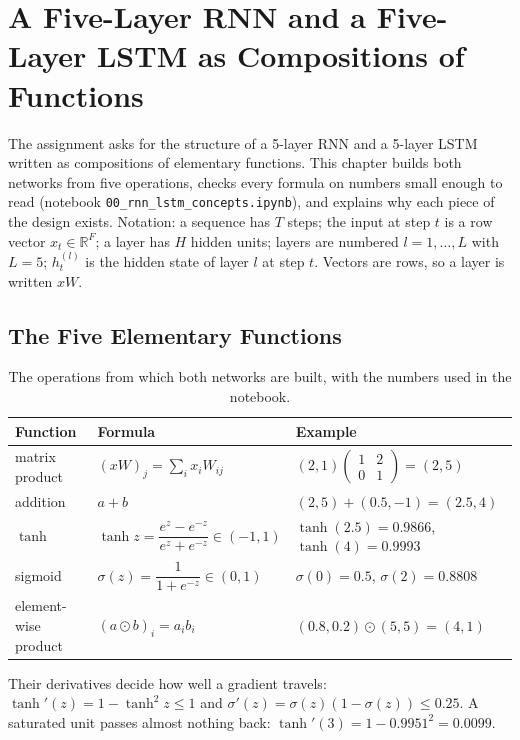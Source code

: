 \section{A Five-Layer RNN and a Five-Layer LSTM as Compositions of Functions}
\label{sec:theory}

The assignment asks for the structure of a 5-layer RNN and a 5-layer LSTM written as compositions of elementary functions. This chapter builds both
networks from five operations, checks every formula on numbers small enough to read (notebook \texttt{00\_rnn\_lstm\_concepts.ipynb}), and explains why each
piece of the design exists. Notation: a sequence has $T$ steps; the input at step $t$ is a row vector $x_t\in\mathbb{R}^F$; a layer has $H$ hidden units;
layers are numbered $l=1,\dots,L$ with $L=5$; $h^{(l)}_t$ is the hidden state of layer $l$ at step $t$. Vectors are rows, so a layer is written $xW$.

\subsection{The Five Elementary Functions}

\begin{table}[H]
\centering
\caption{The operations from which both networks are built, with the numbers used in the notebook.}
\label{tab:elem}
\small
\begin{tabularx}{\textwidth}{@{}l l X@{}}
\toprule
Function & Formula & Example \\
\midrule
matrix product & $(xW)_j=\sum_i x_iW_{ij}$ & $(2,1)\begin{pmatrix}1&2\\0&1\end{pmatrix}=(2,5)$ \\
addition & $a+b$ & $(2,5)+(0.5,-1)=(2.5,4)$ \\
$\tanh$ & $\tanh z=\dfrac{e^z-e^{-z}}{e^z+e^{-z}}\in(-1,1)$ & $\tanh(2.5)=0.9866$, $\tanh(4)=0.9993$ \\
sigmoid & $\sigma(z)=\dfrac1{1+e^{-z}}\in(0,1)$ & $\sigma(0)=0.5$, $\sigma(2)=0.8808$ \\
element-wise product & $(a\odot b)_i=a_ib_i$ & $(0.8,0.2)\odot(5,5)=(4,1)$ \\
\bottomrule
\end{tabularx}
\end{table}

Their derivatives decide how well a gradient travels: $\tanh'(z)=1-\tanh^2z\le1$ and $\sigma'(z)=\sigma(z)(1-\sigma(z))\le0.25$. A saturated unit passes almost nothing back:
$\tanh'(3)=1-0.9951^2=0.0099$.


